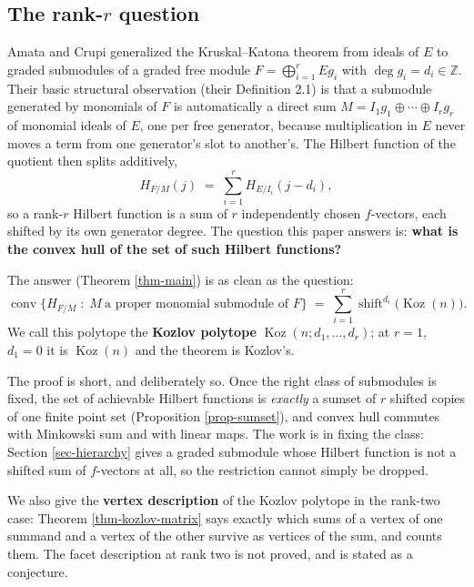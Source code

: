 \documentclass[11pt, a4paper, abstract=yes]{scrartcl}
\theoremstyle{definition}
\theoremstyle{remark}
\theoremstyle{plain}
\newcommand{\Koz}{\operatorname{Koz}}
\newcommand{\shift}{\operatorname{shift}}
\newcommand{\conv}{\operatorname{conv}}
\let\autocite\cite
\begin{document}
\subsection{The rank-\(r\) question}
\label{sec:orgb6c101f}

Amata and Crupi \autocite{AmataCrupi2020KK,AmataCrupi2020} generalized the Kruskal--Katona theorem from ideals of \(E\) to graded
submodules of a graded free module \(F=\bigoplus_{i=1}^rEg_i\) with \(\deg g_i=d_i\in\mathbb Z\).
Their basic structural observation (their Definition 2.1) is that a submodule generated by monomials
of \(F\) is automatically a direct sum \(M=I_1g_1\oplus\cdots\oplus I_rg_r\) of monomial ideals of
\(E\), one per free generator, because multiplication in \(E\) never moves a term from one
generator's slot to another's. The Hilbert function of the quotient then splits additively,
\begin{equation}\label{eq:eq-3}
  H_{F/M}(j)\;=\;\sum_{i=1}^{r}H_{E/I_i}(j-d_i),
\end{equation}
so a rank-\(r\) Hilbert function is a sum of \(r\) independently chosen \(f\)-vectors, each shifted
by its own generator degree. The question this paper answers is: \textbf{what is the convex hull of the set
of such Hilbert functions?}

The answer (Theorem \ref{thm-main}) is as clean as the question:
\begin{equation}\label{eq:eq-4}
  \conv\bigl\lbrace H_{F/M}\;:\;M\ \text{a proper monomial submodule of }F\bigr\rbrace
  \;=\;\sum_{i=1}^{r}\shift^{d_i}\bigl(\Koz(n)\bigr).
\end{equation}
We call this polytope the \textbf{Kozlov polytope} \(\Koz(n;d_1,\dots,d_r)\); at \(r=1\), \(d_1=0\) it is
\(\Koz(n)\) and the theorem is Kozlov's.

The proof is short, and deliberately so. Once the right class of submodules is fixed, the set of
achievable Hilbert functions is \emph{exactly} a sumset of \(r\) shifted copies of one finite point set
(Proposition \ref{prop-sumset}), and convex hull commutes with Minkowski sum and with linear maps. The
work is in fixing the class: Section \ref{sec-hierarchy} gives a graded submodule whose Hilbert
function is not a shifted sum of \(f\)-vectors at all, so the restriction cannot simply be dropped.

We also give the \textbf{vertex description} of the Kozlov polytope in the rank-two case: Theorem
\ref{thm-kozlov-matrix} says exactly which sums of a vertex of one summand and a vertex of the other
survive as vertices of the sum, and counts them. The facet description at rank two is not proved,
and is stated as a conjecture.
\end{document}
